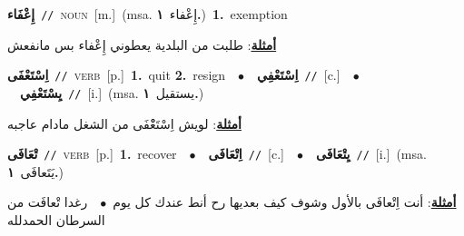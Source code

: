 \documentclass[10pt,a4paper,twoside]{article} %
\begin{document}
\begin{multicols}{2}
{\setlength\topsep{0pt}\textbf{\foreignlanguage{arabic}{إِعْفَاء}}\ {\color{gray}\texttt{//}\color{black}}\ \textsc{noun}\ [m.]\ \color{gray}(msa. \foreignlanguage{arabic}{إِعْفاء}~\foreignlanguage{arabic}{\textbf{١.}})\color{black}\ \textbf{1.}~exemption\  \begin{flushright}\color{gray}\foreignlanguage{arabic}{\textbf{\underline{\foreignlanguage{arabic}{أمثلة}}}: طلبت من البلدية يعطوني إِعْفاء بس مانفعش}\end{flushright}\color{black}} \vspace{2mm}

{\setlength\topsep{0pt}\textbf{\foreignlanguage{arabic}{اِسْتَعْفَى}}\ {\color{gray}\texttt{//}\color{black}}\ \textsc{verb}\ [p.]\ \textbf{1.}~quit  \textbf{2.}~resign\ \ $\bullet$\ \ \setlength\topsep{0pt}\textbf{\foreignlanguage{arabic}{اِسْتَعْفِي}}\ {\color{gray}\texttt{//}\color{black}}\ [c.]\ \ $\bullet$\ \ \setlength\topsep{0pt}\textbf{\foreignlanguage{arabic}{يِسْتَعْفِي}}\ {\color{gray}\texttt{//}\color{black}}\ [i.]\ \color{gray}(msa. \foreignlanguage{arabic}{يستقيل}~\foreignlanguage{arabic}{\textbf{١.}})\color{black}\  \begin{flushright}\color{gray}\foreignlanguage{arabic}{\textbf{\underline{\foreignlanguage{arabic}{أمثلة}}}: لويش اِسْتَعْْفَى من الشغل مادام عاجبه}\end{flushright}\color{black}} \vspace{2mm}

{\setlength\topsep{0pt}\textbf{\foreignlanguage{arabic}{تْعَافَى}}\ {\color{gray}\texttt{//}\color{black}}\ \textsc{verb}\ [p.]\ \textbf{1.}~recover\ \ $\bullet$\ \ \setlength\topsep{0pt}\textbf{\foreignlanguage{arabic}{اِتْعَافَى}}\ {\color{gray}\texttt{//}\color{black}}\ [c.]\ \ $\bullet$\ \ \setlength\topsep{0pt}\textbf{\foreignlanguage{arabic}{يِتْعَافَى}}\ {\color{gray}\texttt{//}\color{black}}\ [i.]\ \color{gray}(msa. \foreignlanguage{arabic}{يَتَعافَى}~\foreignlanguage{arabic}{\textbf{١.}})\color{black}\  \begin{flushright}\color{gray}\foreignlanguage{arabic}{\textbf{\underline{\foreignlanguage{arabic}{أمثلة}}}: أنت اِتْعافَى بالأول وشوف كيف بعديها رح أنط عندك كل يوم\ $\bullet$\ \  رغدا تْعافَت من السرطان الحمدلله}\end{flushright}\color{black}} \vspace{2mm}


\end{multicols}
\end{document}
